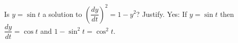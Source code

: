 {Is $y = \sin t$ a solution to ${\left( \dfrac{dy}{dt} \right)}^2 = 1 - y^2$?
Justify.}
{Yes: If $y=\sin t$ then $\dfrac{dy}{dt}=\cos t$ and $1-\sin^2 t = \cos^2 t$.}